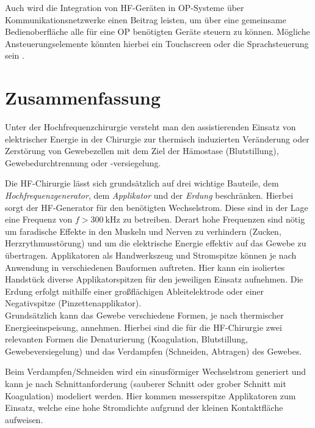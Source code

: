 \documentclass[letterpaper,12pt]{article}
\begin{document}
		Auch wird die Integration von HF-Geräten in OP-Systeme über Kommunikationsnetzwerke einen Beitrag leisten, um über eine gemeinsame Bedienoberfläche alle für eine OP benötigten Geräte steuern zu können. Mögliche Ansteuerungselemente könnten hierbei ein Touchscreen oder die Sprachsteuerung sein \cite{kramme2016medizintechnik}.
		
		

	\newpage
	
	
		
	\newpage	
	\section*{Zusammenfassung}
	
		Unter der Hochfrequenzchirurgie versteht man den assistierenden Einsatz von elektrischer Energie in der Chirurgie zur thermisch induzierten Veränderung oder Zerstörung von Gewebezellen mit dem Ziel der Hämostase (Blutstillung), Gewebedurchtrennung oder -versiegelung.
		
		Die HF-Chirurgie lässt sich grundsätzlich auf drei wichtige Bauteile, dem \emph{Hochfrequenzgenerator}, dem \emph{Applikator} und der \emph{Erdung} beschränken. Hierbei sorgt der HF-Generator für den benötigten Wechselstrom. Diese sind in der Lage eine Frequenz von $f>\SI{300}{\kilo\hertz}$ zu betreiben. Derart hohe Frequenzen sind nötig um faradische Effekte in den Muskeln und Nerven zu verhindern (Zucken, Herzrythmusstörung) und um die elektrische Energie effektiv auf das Gewebe zu übertragen. Applikatoren als Handwerkszeug und Stromspitze können je nach Anwendung in verschiedenen Bauformen auftreten. Hier kann ein isoliertes Handstück diverse Applikatorspitzen für den jeweiligen Einsatz aufnehmen. Die Erdung erfolgt mithilfe einer großflächigen Ableitelektrode oder einer Negativspitze (Pinzettenapplikator).\\
		
		Grundsätzlich kann das Gewebe verschiedene Formen, je nach thermischer Energieeinspeisung, annehmen. Hierbei sind die für die HF-Chirurgie zwei relevanten Formen die Denaturierung (Koagulation, Blutstillung, Gewebeversiegelung) und das Verdampfen (Schneiden, Abtragen) des Gewebes. 
		
		Beim Verdampfen/Schneiden wird ein sinusförmiger Wechselstrom generiert und kann je nach Schnittanforderung (sauberer Schnitt oder grober Schnitt mit Koagulation) modeliert werden. Hier kommen messerspitze Applikatoren zum Einsatz, welche eine hohe Stromdichte aufgrund der kleinen Kontaktfläche aufweisen. 
		
\end{document}
